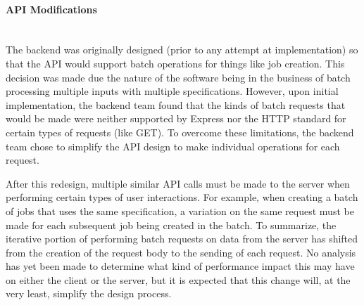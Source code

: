 \paragraph{API Modifications} \mbox{}\\[\paragraphheaderspace]
The backend was originally designed (prior to any attempt at implementation) so that the API would support batch operations for things like job creation. This decision was made due the nature of the software being in the business of batch processing multiple inputs with multiple specifications. However, upon initial implementation, the backend team found that the kinds of batch requests that would be made were neither supported by Express nor the HTTP standard for certain types of requests (like GET). To overcome these limitations, the backend team chose to simplify the API design to make individual operations for each request.\par
After this redesign, multiple similar API calls must be made to the server when performing certain types of user interactions. For example, when creating a batch of jobs that uses the same specification, a variation on the same request must be made for each subsequent job being created in the batch. To summarize, the iterative portion of performing batch requests on data from the server has shifted from the creation of the request body to the sending of each request. No analysis has yet been made to determine what kind of performance impact this may have on either the client or the server, but it is expected that this change will, at the very least, simplify the design process.\par
